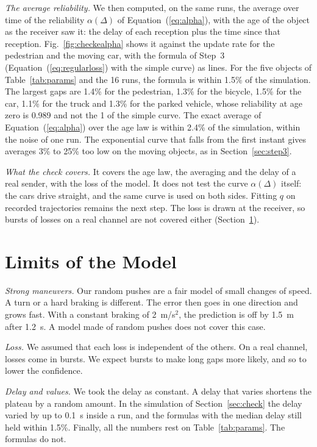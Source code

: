 \documentclass[conference]{IEEEtran}
\newcommand{\Eq}[1]{Equation~(\ref{#1})}     %
\begin{document}
\emph{The average reliability.} We then computed, on the same runs, the
average over time of the reliability $\alpha(\Delta)$ of \Eq{eq:alpha},
with the age of the object as the receiver saw it: the delay of each
reception plus the time since that reception. Fig.~\ref{fig:checkealpha}
shows it against the update rate for the pedestrian and the moving car, with
the formula of Step~3 (\Eq{eq:regularloss} with the simple curve) as lines.
For the five objects of Table~\ref{tab:params} and the 16 runs, the formula
is within 1.5\% of the simulation. The largest gaps are 1.4\% for the
pedestrian, 1.3\% for the bicycle, 1.5\% for the car, 1.1\% for the truck and
1.3\% for the parked vehicle, whose reliability at age zero is 0.989 and not
the 1 of the simple curve. The exact average of \Eq{eq:alpha} over the age
law is within 2.4\% of the simulation, within the noise of one run. The
exponential curve that falls from the first instant gives averages 3\% to
25\% too low on the moving objects, as in Section~\ref{sec:step3}.

\emph{What the check covers.} It covers the age law, the averaging and the
delay of a real sender, with the loss of the model. It does not test the
curve $\alpha(\Delta)$ itself: the cars drive straight, and the same curve is
used on both sides. Fitting $q$ on recorded trajectories remains the next
step. The loss is drawn at the receiver, so bursts of losses on a real
channel are not covered either (Section~\ref{sec:limits}).

\section{Limits of the Model}\label{sec:limits}

\emph{Strong maneuvers.} Our random pushes are a fair model of small changes
of speed. A turn or a hard braking is different. The error then goes in one
direction and grows fast. With a constant braking of 2~m/s$^2$, the prediction
is off by 1.5~m after 1.2~s. A model made of random pushes does not cover this
case.

\emph{Loss.} We assumed that each loss is independent of the others. On a real
channel, losses come in bursts. We expect bursts to make long gaps more
likely, and so to lower the confidence.

\emph{Delay and values.} We took the delay as constant. A delay that varies
shortens the plateau by a random amount. In the simulation of
Section~\ref{sec:check} the delay varied by up to 0.1~s inside a run, and the
formulas with the median delay still held within 1.5\%. Finally, all the
numbers rest on Table~\ref{tab:params}. The formulas do not.
\end{document}
